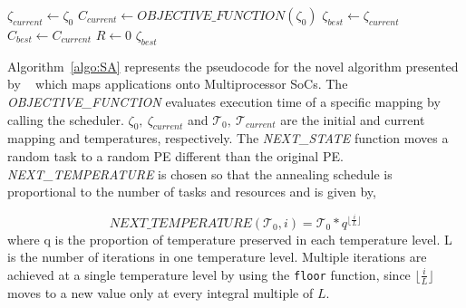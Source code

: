 \begin{algorithm}[h!]
  \small{
    \caption{$Simulated\_Annealing(\zeta_0, \mathcal{T}_0)$}
    \label{algo:SA}
    $\zeta_{current} \leftarrow \zeta_0$ \;
    $C_{current} \leftarrow OBJECTIVE\_FUNCTION(\zeta_0)$ \;
    $\zeta_{best} \leftarrow \zeta_{current}$\;
    $C_{best} \leftarrow C_{current}$\;
    $R \leftarrow 0$\;
    \Return $\zeta_{best}$
  }
\end{algorithm}

Algorithm~\ref{algo:SA} represents the pseudocode for the novel
algorithm presented by ~\cite{hors06} which maps applications onto
Multiprocessor SoCs.  The \textit{OBJECTIVE\_FUNCTION} evaluates
execution time of a specific mapping by calling the
scheduler. $\zeta_0,\ \zeta_{current}$ and $\mathcal{T}_0,\
\mathcal{T}_{current}$ are the initial and current mapping and
temperatures, respectively. The \textit{NEXT\_STATE} function moves a
random task to a random PE different than the original
PE. \textit{NEXT\_TEMPERATURE} is chosen so that the annealing schedule
is proportional to the number of tasks and resources and is given by,

\begin{equation}
\label{eq:3}
\textit{NEXT\_TEMPERATURE}(\mathcal{T}_0, i) = \mathcal{T}_0*q^{\lfloor
\frac{i}{L} \rfloor}
\end{equation}
\noindent
where q is the proportion of temperature preserved in each temperature
level. %
L is the number of iterations in one temperature level. Multiple
iterations are achieved at a single temperature level by using the
\texttt{floor} function, since $\lfloor \frac{i}{L} \rfloor$ moves to a
new value only at every integral multiple of $L$.

